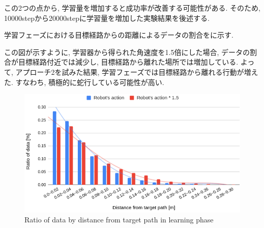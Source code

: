   この2つの点から, 学習量を増加すると成功率が改善する可能性がある. そのため, 10000stepから20000stepに学習量を増加した実験結果を後述する.

  \newpage


  学習フェーズにおける目標経路からの距離によるデータの割合をに示す. \par
  この図が示すように, 学習器から得られた角速度を1.5倍にした場合, データの割合が目標経路付近では減少し, 目標経路から離れた場所では増加している. よって, アプローチ2を試みた結果, 学習フェーズでは目標経路から離れる行動が増えた. すなわち, 積極的に蛇行している可能性が高い.


  \begin{figure}[hbtp]
    \centering
   \includegraphics[keepaspectratio, scale=0.37]
        {images/hist_act_training2.png}
   \caption{Ratio of data by distance from target path in learning phase}
   \label{Fig:hist_act_training}
  \end{figure}  

